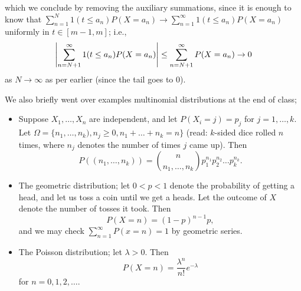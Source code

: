 which we conclude by removing the auxiliary summations, since it is enough to know that $\sum_{n=1}^N 1(t \leq a_n) P(X = a_n) \to \sum_{n=1}^\infty 1(t \leq a_n) P(X = a_n)$ uniformly in $t \in [m-1, m]$; i.e.,
\[ \left\lvert \sum_{n=N+1}^\infty 1(t \leq a_n) P(X = a_n) \right\rvert \leq \sum_{n=N+1}^\infty P(X = a_n) \to 0 \]
as $N \to \infty$ as per earlier (since the tail goes to $0$).

\newpage
We also briefly went over examples multinomial distributions at the end of class;
\begin{itemize}
    \item Suppose $X_1, \dots, X_n$ are independent, and let $P(X_i = j) = p_j$ for $j = 1, \dots, k$. Let $\Omega = \{n_1, \dots, n_k), n_j \geq 0, n_1 + \dots + n_k = n\}$ (read: $k$-sided dice rolled $n$ times, where $n_j$ denotes the number of times $j$ came up). Then
    \[ P((n_1, \dots, n_k)) = \binom{n}{n_1, \dots, n_k} p_1^{n_1} p_2^{n_2} \dots p_k^{n_k}. \]
    \item The geometric distribution; let $0 < p < 1$ denote the probability of getting a head, and let us toss a coin until we get a heads. Let the outcome of $X$ denote the number of tosses it took. Then
    \[ P(X = n) = (1 - p)^{n-1} p, \]
    and we may check $\sum_{n=1}^\infty P(x = n) = 1$ by geometric series.
    \item The Poisson distribution; let $\lambda > 0$. Then
    \[ P(X = n) = \frac{\lambda^n}{n!} e^{-\lambda} \]
    for $n = 0, 1, 2, \dots$.
\end{itemize}
